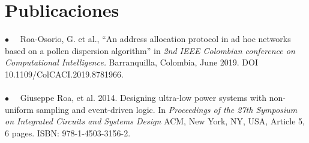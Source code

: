 \documentclass[11pt]{friggeri-cv} %
\begin{document}
\section{Publicaciones}
{$\bullet\quad$ Roa-Osorio, G. et al., “An address allocation protocol in ad hoc networks based on a pollen dispersion algorithm” in {\itshape{2nd IEEE Colombian conference on Computational Intelligence.}} Barranquilla, Colombia, June 2019. DOI 10.1109/ColCACI.2019.8781966.\\\\}
{$\bullet\quad$ Giuseppe Roa, et al. 2014. Designing ultra-low power systems with non-uniform sampling and event-driven logic. In {\itshape{Proceedings of the 27th Symposium on Integrated Circuits and Systems Design}} ACM, New York, NY, USA, Article 5, 6 pages. ISBN: 978-1-4503-3156-2.\\}
\end{document}
